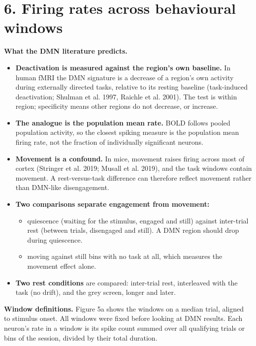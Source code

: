 \documentclass[10pt,a4paper]{article}
\begin{document}
\section{6. Firing rates across behavioural windows}
\textbf{What the DMN literature predicts.}

\begin{itemize}
\item \textbf{Deactivation is measured against the region's own baseline.} In human fMRI the DMN signature is a decrease of a region's own activity during externally directed tasks, relative to its resting baseline (task-induced deactivation; Shulman et al. 1997, Raichle et al. 2001). The test is within region; specificity means other regions do not decrease, or increase.
\item \textbf{The analogue is the population mean rate.} BOLD follows pooled population activity, so the closest spiking measure is the population mean firing rate, not the fraction of individually significant neurons.
\item \textbf{Movement is a confound.} In mice, movement raises firing across most of cortex (Stringer et al. 2019; Musall et al. 2019), and the task windows contain movement. A rest-versus-task difference can therefore reflect movement rather than DMN-like disengagement.
\item \textbf{Two comparisons separate engagement from movement:} 
\begin{itemize}
\item quiescence (waiting for the stimulus, engaged and still) against inter-trial rest (between trials, disengaged and still). A DMN region should drop during quiescence.
\item moving against still bins with no task at all, which measures the movement effect alone.
\end{itemize}
\item \textbf{Two rest conditions} are compared: inter-trial rest, interleaved with the task (no drift), and the grey screen, longer and later.
\end{itemize}
\textbf{Window definitions.} Figure 5a shows the windows on a median trial, aligned to stimulus onset. All windows were fixed before looking at DMN results. Each neuron's rate in a window is its spike count summed over all qualifying trials or bins of the session, divided by their total duration.
\end{document}

